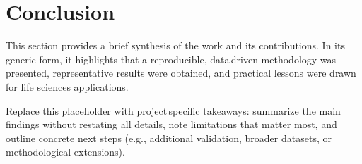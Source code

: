 \section{Conclusion}

\noindent This section provides a brief synthesis of the work and its contributions. In its generic form, it highlights that a reproducible, data\,driven methodology was presented, representative results were obtained, and practical lessons were drawn for life sciences applications.

\noindent Replace this placeholder with project\,specific takeaways: summarize the main findings without restating all details, note limitations that matter most, and outline concrete next steps (e.g., additional validation, broader datasets, or methodological extensions).